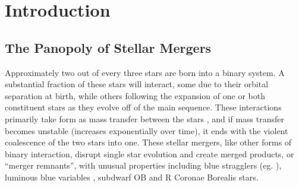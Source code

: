 \chapter{Introduction}


\section{The Panopoly of Stellar Mergers}
\label{sec:c1_stellarmergers}

Approximately two out of every three stars are born into a binary system.  A substantial fraction of these stars will interact, some due to their orbital separation at birth, while others following the expansion of one or both constituent stars as they evolve off of the main sequence.  These interactions primarily take form as mass transfer between the stars \citep{yung05}, and if mass transfer becomes unstable (increases exponentially over time), it ends with the violent coalescence of the two stars into one.  These stellar mergers, like other forms of binary interaction, disrupt single star evolution and create merged products, or ``merger remnants'', with unusual properties including blue stragglers (eg. \citealt{andrpt06, knigs09}), luminous blue variables \citep{justpv14}, subdwarf OB and R Coronae Borealis stars.

